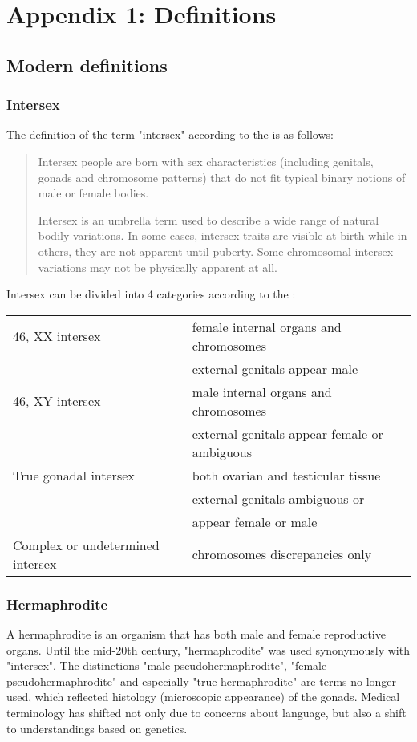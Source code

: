 \section{Appendix 1: Definitions}
\label{appendix2}

\subsection{Modern definitions}
\subsubsection{Intersex}
The definition of the term "intersex" according to the \cite{un2015} is as follows:

\begin{quote}
Intersex people are born with sex characteristics (including genitals, gonads and chromosome patterns) that do not fit typical binary notions of male or female bodies.

Intersex is an umbrella term used to describe a wide range of natural bodily variations. In some cases, intersex traits are visible at birth while in others, they are not apparent until puberty. Some chromosomal intersex variations may not be physically apparent at all.
\end{quote}

Intersex can be divided into 4 categories according to the \cite{nlm}:

\begin{tabular}{ l l }
46, XX intersex & female internal organs and chromosomes \\
& external genitals appear male \\
46, XY intersex & male internal organs and chromosomes \\
& external genitals appear female or ambiguous \\
True gonadal intersex & both ovarian and testicular tissue \\
& external genitals ambiguous or \\
& appear female or male \\
Complex or undetermined intersex & chromosomes discrepancies only \\
\end{tabular}


\subsubsection{Hermaphrodite}
A hermaphrodite is an organism that has both male and female reproductive organs. Until the mid-20th century, "hermaphrodite" was used synonymously with "intersex". The distinctions "male pseudohermaphrodite", "female pseudohermaphrodite" and especially "true hermaphrodite" are terms no longer used, which reflected histology (microscopic appearance) of the gonads. Medical terminology has shifted not only due to concerns about language, but also a shift to understandings based on genetics.

